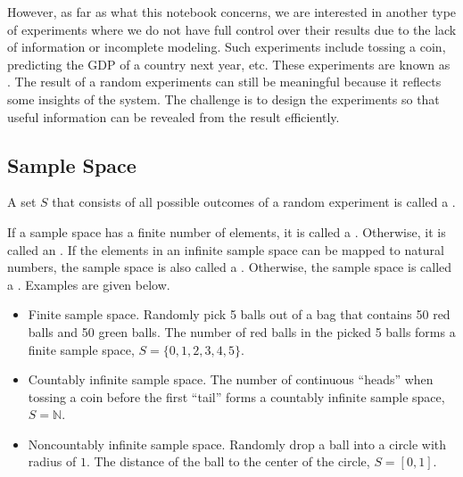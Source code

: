 However, as far as what this notebook concerns, we are interested in another type of experiments where we do not have full control over their results due to the lack of information or incomplete modeling. Such experiments include tossing a coin, predicting the GDP of a country next year, etc. These experiments are known as . The result of a random experiments can still be meaningful because it reflects some insights of the system. The challenge is to design the experiments so that useful information can be revealed from the result efficiently.

\subsection{Sample Space}

A set $S$ that consists of all possible outcomes of a random experiment is called a .

If a sample space has a finite number of elements, it is called a . Otherwise, it is called an . If the elements in an infinite sample space can be mapped to natural numbers, the sample space is also called a . Otherwise, the sample space is called a . Examples are given below.
\begin{itemize}
	\item Finite sample space. Randomly pick 5 balls out of a bag that contains 50 red balls and 50 green balls. The number of red balls in the picked 5 balls forms a finite sample space, $S = \{0, 1, 2, 3, 4, 5\}$.
	\item Countably infinite sample space. The number of continuous ``heads'' when tossing a coin before the first ``tail'' forms a countably infinite sample space, $S = \mathbb{N}$.
	\item Noncountably infinite sample space. Randomly drop a ball into a circle with radius of $1$. The distance of the ball to the center of the circle, $S=[0,1]$.
\end{itemize}

